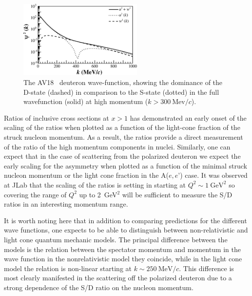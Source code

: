 \begin{figure}
\begin{center}
\includegraphics[width=0.55\textwidth]{figs/sd_wf_av18.eps}
\caption{\label{sd-wf} The AV18~\cite{PhysRevC.84.034003} deuteron wave-function, showing the dominance of the D-state (dashed) in comparison to the S-state (dotted) in the full wavefunction (solid) at high momentum ($k>300\mathrm{~Mev}/c$).}
\end{center}
\end{figure}

Ratios of inclusive cross sections at $x>1$ has demonstrated an early onset of the scaling of the ratios when plotted as a function of the light-cone fraction of the struck nucleon momentum.  As a result, the ratios provide a direct measurement of the ratio of the high momentum components in nuclei.  Similarly, one can expect that in the case of scattering from the polarized deuteron we expect the early scaling for the asymmetry when plotted as a function of the minimal struck nucleon momentum or the light cone fraction in the A($e,e’$) case.
It was observed at JLab that the scaling of the ratios is setting in starting at $Q^2 \sim 1 \mathrm{~GeV}^2$ so covering the range of $Q^2$ up to 2~GeV$^2$ will be sufficient to  measure the S/D ratios in an interesting momentum range. 







It is worth noting here that in addition to comparing predictions for the different wave functions, one expects to be able to distinguish between non-relativistic and light cone quantum mechanic models.  The principal difference between the models is the relation between the spectator momentum and momentum in the wave function in the nonrelativistic model they coincide, while in the light cone model the relation is non-linear starting at $k \sim 250 \mathrm{~MeV}/c$. This difference is most clearly manifested in the scattering off the polarized deuteron due to a strong dependence of the S/D ratio on the nucleon momentum.


